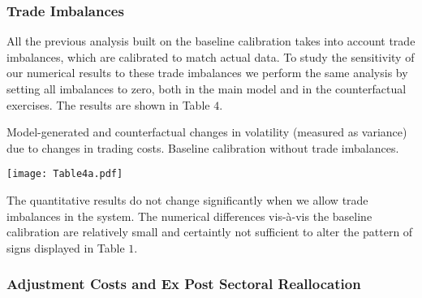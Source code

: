 \documentclass[12pt]{article}
\begin{document}
\subsubsection{Trade Imbalances}

All the previous analysis built on the baseline calibration takes into
account trade imbalances, which are calibrated to match actual data. To
study the sensitivity of our numerical results  to these trade imbalances we
perform the same analysis by setting all imbalances to zero, both in the
main model and in the counterfactual exercises. The results are shown in
Table $4.$

\begin{table}[h]
\caption{Model-generated and counterfactual changes in volatility (measured
as variance) due to changes in trading costs. Baseline calibration without
trade imbalances.}\centering\texttt{[image: Table4a.pdf]}
\end{table}

The quantitative results do not change significantly when we allow trade
imbalances in the system. The numerical differences vis-\`{a}-vis the
baseline calibration are relatively small and certaintly not sufficient to
alter the pattern of signs displayed in Table $1$.

\subsubsection{Adjustment Costs and Ex Post Sectoral Reallocation}
\end{document}
